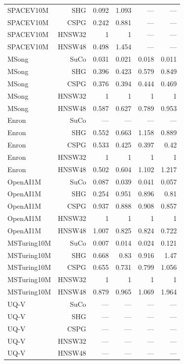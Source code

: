 \begin{table}[t]
\begin{tabular}{lrrrrr}
SPACEV10M & SHG & 0.092 & 1.093 & — & — \\
SPACEV10M & CSPG & 0.242 & 0.881 & — & — \\
SPACEV10M & HNSW32 & 1 & 1 & — & — \\
SPACEV10M & HNSW48 & 0.498 & 1.454 & — & — \\
MSong & SuCo & 0.031 & 0.021 & 0.018 & 0.011 \\
MSong & SHG & 0.396 & 0.423 & 0.579 & 0.849 \\
MSong & CSPG & 0.376 & 0.394 & 0.444 & 0.469 \\
MSong & HNSW32 & 1 & 1 & 1 & 1 \\
MSong & HNSW48 & 0.587 & 0.627 & 0.789 & 0.953 \\
Enron & SuCo & — & — & — & — \\
Enron & SHG & 0.552 & 0.663 & 1.158 & 0.889 \\
Enron & CSPG & 0.533 & 0.425 & 0.397 & 0.42 \\
Enron & HNSW32 & 1 & 1 & 1 & 1 \\
Enron & HNSW48 & 0.502 & 0.604 & 1.102 & 1.217 \\
OpenAI1M & SuCo & 0.087 & 0.039 & 0.041 & 0.057 \\
OpenAI1M & SHG & 0.254 & 0.951 & 0.896 & 0.81 \\
OpenAI1M & CSPG & 0.937 & 0.888 & 0.908 & 0.857 \\
OpenAI1M & HNSW32 & 1 & 1 & 1 & 1 \\
OpenAI1M & HNSW48 & 1.007 & 0.825 & 0.824 & 0.722 \\
MSTuring10M & SuCo & 0.007 & 0.014 & 0.024 & 0.121 \\
MSTuring10M & SHG & 0.668 & 0.83 & 0.916 & 1.47 \\
MSTuring10M & CSPG & 0.655 & 0.731 & 0.799 & 1.056 \\
MSTuring10M & HNSW32 & 1 & 1 & 1 & 1 \\
MSTuring10M & HNSW48 & 0.879 & 0.965 & 1.069 & 1.964 \\
UQ-V & SuCo & — & — & — & — \\
UQ-V & SHG & — & — & — & — \\
UQ-V & CSPG & — & — & — & — \\
UQ-V & HNSW32 & — & — & — & — \\
UQ-V & HNSW48 & — & — & — & — \\
\bottomrule
\end{tabular}
\end{table}
